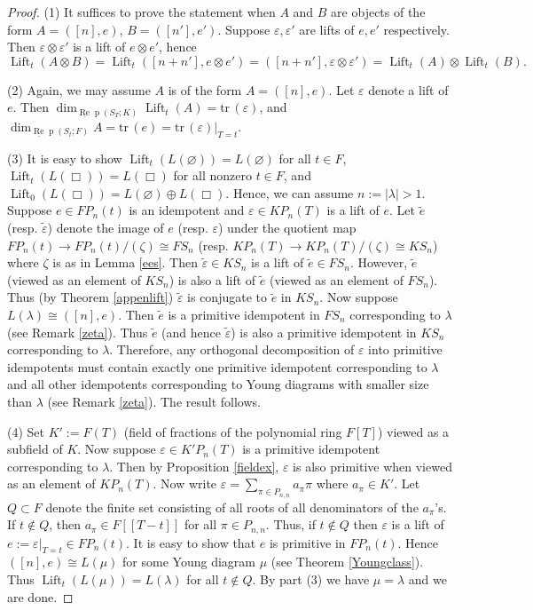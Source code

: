 \documentclass{amsart}
\theoremstyle{definition}
\def\uRep{\underline{\operatorname{Re}}\!\operatorname{p}}
\newcommand{\Lift}{\operatorname{Lift}}
\newcommand{\tr}{\text{tr}\,}
\renewcommand{\1}{_{(1)}}
\renewcommand{\2}{_{(2)}}
\newcommand{\3}{_{(3)}}
\newcommand{\4}{_{(4)}}
\newcommand{\ep}{\varepsilon}
\begin{document}
\begin{proof}  (1) It suffices to prove the statement when $A$ and $B$ are objects of the form $A=([n], e)$, $B=([n'], e')$.  Suppose $\ep, \ep'$ are lifts of $e, e'$ respectively.  Then $\ep\otimes\ep'$ is a lift of $e\otimes e'$, hence $$\Lift_t(A\otimes B)=\Lift_t([n+n'], e\otimes e')=([n+n'], \ep\otimes\ep')=\Lift_t(A)\otimes\Lift_t(B).$$

(2) Again, we may assume $A$ is of the form $A=([n], e)$. Let  $\ep$ denote a lift of $e$.  Then $\dim_{\uRep(S_T; K)}\Lift_t(A)=\tr(\ep)$, and $\dim_{\uRep(S_t; F)}A=\tr(e)=\tr(\ep)|_{T=t}$.

(3) It is easy to show $\Lift_t(L(\varnothing))=L(\varnothing)$ for all $t\in F$, $\Lift_t(L(\Box))=L(\Box)$ for all nonzero $t\in F$, and $\Lift_0(L(\Box))=L(\varnothing)\oplus L(\Box)$.  Hence, we can assume $n:=|\lambda|>1$.   Suppose $e\in FP_n(t)$ is an idempotent and  $\ep\in KP_n(T)$ is a lift of $e$.  Let $\tilde{e}$ (resp. $\tilde{\ep}$) denote the image of $e$ (resp. $\ep$) under the quotient map $FP_n(t)\to FP_n(t)/(\zeta)\cong FS_n$ (resp.  $KP_n(T)\to KP_n(T)/(\zeta)\cong KS_n$) where $\zeta$ is as in Lemma \ref{ees}.  Then $\tilde{\ep}\in KS_n$ is a lift of $\tilde{e}\in FS_n$.  However, $\tilde{e}$ (viewed as an element of $KS_n$) is also a lift of $\tilde{e}$ (viewed as an element of $FS_n$).  Thus (by Theorem \ref{appenlift}) $\tilde{\ep}$ is conjugate to $\tilde{e}$ in $KS_n$.  Now suppose $L(\lambda)\cong([n], e)$.  Then $\tilde{e}$ is a primitive idempotent in $FS_n$ corresponding to $\lambda$ (see Remark \ref{zeta}).  Thus $\tilde{e}$ (and hence $\tilde{\ep}$) is also a primitive idempotent in $KS_n$ corresponding to $\lambda$.  Therefore, any orthogonal decomposition of $\ep$ into primitive idempotents must contain exactly one primitive idempotent corresponding to $\lambda$ and all other idempotents corresponding to Young diagrams with smaller size than $\lambda$ (see Remark \ref{zeta}).  The result follows.

(4)  Set $K':=F(T)$ (field of fractions of the polynomial ring $F[T]$) viewed as a subfield of $K$.  Now suppose $\ep\in K'P_n(T)$ is a primitive idempotent corresponding to $\lambda$.  Then by Proposition \ref{fieldex}, $\ep$ is also primitive when viewed as an element of $KP_n(T)$.  Now write $\ep=\sum_{\pi\in P_{n,n}}a_\pi \pi$ where $a_\pi\in K'$.  Let $Q\subset F$ denote the finite set consisting of all roots of all denominators of the $a_\pi$'s.  If $t\not\in Q$, then $a_\pi\in F[[T-t]]$ for all $\pi\in P_{n,n}$.  Thus, if $t\not\in Q$ then $\ep$ is a lift of $e:=\ep|_{T=t}\in FP_n(t)$.  It is easy to show that $e$ is primitive in $FP_n(t)$.  Hence $([n], e)\cong L(\mu)$ for some Young diagram $\mu$ (see Theorem \ref{Youngclass}).  Thus $\Lift_t(L(\mu))=L(\lambda)$ for all $t\not\in Q$.  By part (3) we have $\mu=\lambda$ and we are done.


\end{proof}
\end{document}

